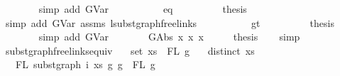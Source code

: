 \begin{isabellebody}
\ \ \ \ \ \ \isamarkupfalse%
\ {\isacharparenleft}{\kern0pt}simp\ add{\isacharcolon}{\kern0pt}\ GVar{\isacharparenright}{\kern0pt}\isanewline
\ \ \ \ \isamarkupfalse%
\isanewline
\ \ \ \ \isamarkupfalse%
\ eq\isanewline
\ \ \ \ \ \ \isamarkupfalse%
\ \isamarkupfalse%
\ {\isacharquery}{\kern0pt}thesis\isanewline
\ \ \ \ \ \ \isamarkupfalse%
\ {\isacharparenleft}{\kern0pt}simp\ add{\isacharcolon}{\kern0pt}\ GVar\ assms{\isacharparenleft}{\kern0pt}{}{\isacharcomma}{\kern0pt}{}{\isacharparenright}{\kern0pt}\ lsubst{\isacharunderscore}{\kern0pt}graph{\isacharunderscore}{\kern0pt}freelinks{\isacharparenright}{\kern0pt}\isanewline
\ \ \ \ \isamarkupfalse%
\isanewline
\ \ \ \ \isamarkupfalse%
\ gt\isanewline
\ \ \ \ \ \ \isamarkupfalse%
\ \isamarkupfalse%
\ {\isacharquery}{\kern0pt}thesis\isanewline
\ \ \ \ \ \ \isamarkupfalse%
\ {\isacharparenleft}{\kern0pt}simp\ add{\isacharcolon}{\kern0pt}\ GVar{\isacharparenright}{\kern0pt}\isanewline
\ \ \ \isamarkupfalse%
\isanewline
{}\isamarkupfalse%
\isanewline
\ \ \isamarkupfalse%
\ {\isacharparenleft}{\kern0pt}GAbs\ x{}{}\ x{}{}\ x{}{}{\isacharparenright}{\kern0pt}\isanewline
\ \ \isamarkupfalse%
\ \isamarkupfalse%
\ {\isacharquery}{\kern0pt}thesis\isanewline
\ \ \isamarkupfalse%
\ simp\isanewline
{}\isamarkupfalse%
%
\endisatagproof
{\isafoldproof}%
%
\isadelimproof
\isanewline
%
\endisadelimproof
\isanewline
\isanewline
{}\isamarkupfalse%
\ subst{\isacharunderscore}{\kern0pt}graph{\isacharunderscore}{\kern0pt}freelinks{\isacharunderscore}{\kern0pt}equiv{\isacharcolon}{\kern0pt}\isanewline
\ \ \ {\isachardoublequoteopen}set\ xs\ {\isacharequal}{\kern0pt}\ FL\ g{}{\isachardoublequoteclose}\isanewline
\ \ \ {\isachardoublequoteopen}distinct\ xs{\isachardoublequoteclose}\isanewline
\ \ \ {\isachardoublequoteopen}FL\ {\isacharparenleft}{\kern0pt}subst{\isacharunderscore}{\kern0pt}graph\ i\ xs\ g{}\ g{\isacharparenright}{\kern0pt}\ {\isacharequal}{\kern0pt}\ FL\ g{\isachardoublequoteclose}\isanewline
%
\isadelimproof
%
\endisadelimproof
%
\isatagproof
{}\isamarkupfalse%

\end{isabellebody}
